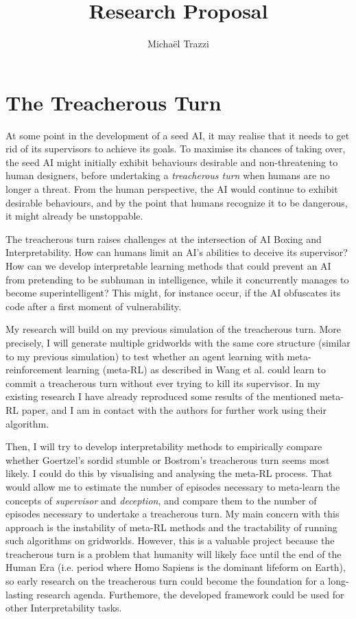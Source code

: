 \documentclass{article}
\title{Research Proposal}
\author{Michaël Trazzi}
\begin{document}
\maketitle

\section*{The Treacherous Turn}

At some point in the development of a seed AI, it may realise that it needs to get rid of its supervisors to achieve its goals. To maximise its chances of taking over, the seed AI might initially exhibit behaviours desirable and non-threatening to human designers, before undertaking a \textit{treacherous turn} when humans are no longer a threat\cite{Bostrom2014}. From the human perspective, the AI would continue to exhibit desirable behaviours, and by the point that humans recognize it to be dangerous, it might already be unstoppable.	

The treacherous turn raises challenges at the intersection of AI Boxing and Interpretability. How can humans limit an AI’s abilities to deceive its supervisor\cite{Amstrong2017}\cite{Trazzi2018stupidity}? How can we develop interpretable learning methods that could prevent an AI from pretending to be subhuman in intelligence, while it concurrently manages to  become superintelligent? This might, for instance occur, if the AI obfuscates its code after a first moment of vulnerability\cite{Bostrom2014}.

My research will build on my previous simulation of the treacherous turn\cite{Trazzi2018code}. More precisely, I will generate multiple gridworlds with the same core structure (similar to my previous simulation) to test whether an agent learning with meta-reinforcement learning (meta-RL) as described in Wang et al.\cite{Wang2016} could learn to commit a treacherous turn without ever trying to kill its supervisor. In my existing research I have already reproduced some results of the mentioned meta-RL paper\cite{TrazziDec2018code}, and I am in contact with the authors for further work using their algorithm.

Then, I will try to develop interpretability methods to empirically compare whether Goertzel’s sordid stumble or Bostrom’s treacherous turn seems most likely\cite{baum2018modeling}. I could do this by visualising and analysing the meta-RL process. That would allow me to estimate the number of episodes necessary to meta-learn the concepts of \textit{supervisor} and \textit{deception}, and compare them to the number of episodes necessary to undertake a treacherous turn. My main concern with this approach is the instability of meta-RL methods and the tractability of running such algorithms on gridworlds. However, this is a valuable project because the treacherous turn is a problem that humanity will likely face until the end of the Human Era (i.e. period where Homo Sapiens is the dominant lifeform on Earth), so early research on the treacherous turn could become the foundation for a long-lasting research agenda. Furthemore, the developed framework could be used for other Interpretability tasks.
\end{document}
